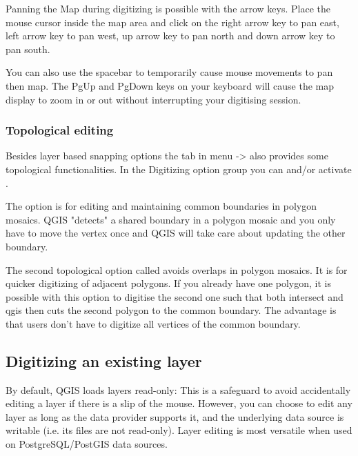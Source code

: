 
Panning the Map during digitizing is possible with the arrow keys. Place
the mouse cursor inside the map area and click on the right arrow key to
pan east, left arrow key to pan west, up arrow key to pan north and down
arrow key to pan south.

You can also use the spacebar to temporarily cause mouse movements to pan
then map. The PgUp and PgDown keys on your keyboard will cause the map
display to zoom in or out without interrupting your digitising session.

\subsubsection{Topological editing}

Besides layer based snapping options the  tab in menu 
 ->  
also provides some topological functionalities. 
In the Digitizing option group you can  and/or activate 
.


The option  is for editing and maintaining 
common boundaries in polygon mosaics. QGIS "detects" a shared boundary in 
a polygon mosaic and you only have to move the vertex once and QGIS will take 
care about updating the other boundary.


The second topological option called  
avoids overlaps in polygon mosaics. It is for quicker digitizing of adjacent polygons. 
If you already have one polygon, it is possible with this option to digitise the second 
one such that both intersect and qgis then cuts the second polygon to the common boundary. 
The advantage is that users don't have to digitize all vertices of the common boundary.

\subsection{Digitizing an existing layer}
\label{sec:edit_existing_layer}

By default, QGIS loads layers read-only: This is a safeguard
to avoid accidentally editing a layer if there is a slip of the mouse.
However, you can choose to edit any layer as long as the data provider
supports it, and the underlying data source is writable (i.e. its files are
not read-only). Layer editing is most versatile when used on
PostgreSQL/PostGIS data sources.

